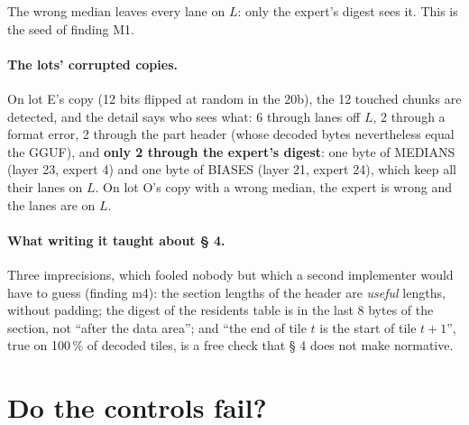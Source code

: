 The wrong median leaves every lane on $L$: only the expert's digest sees it. This is the seed of finding M1.

\paragraph{The lots' corrupted copies.} On lot E's copy (12 bits flipped at random in the 20b), the 12 touched chunks are detected, and the detail says who sees what: 6 through lanes off $L$, 2 through a format error, 2 through the part header (whose decoded bytes nevertheless equal the GGUF), and \textbf{only 2 through the expert's digest}: one byte of MEDIANS (layer 23, expert 4) and one byte of BIASES (layer 21, expert 24), which keep all their lanes on $L$. On lot O's copy with a wrong median, the expert is wrong and the lanes are on $L$.

\paragraph{What writing it taught about § 4.} Three imprecisions, which fooled nobody but which a second implementer would have to guess (finding m4): the section lengths of the header are \emph{useful} lengths, without padding; the digest of the residents table is in the last 8 bytes of the section, not ``after the data area''; and ``the end of tile $t$ is the start of tile $t+1$'', true on \num{100}\,\% of decoded tiles, is a free check that § 4 does not make normative.

\section{Do the controls fail?}\label{t2e-sec:temoins}


